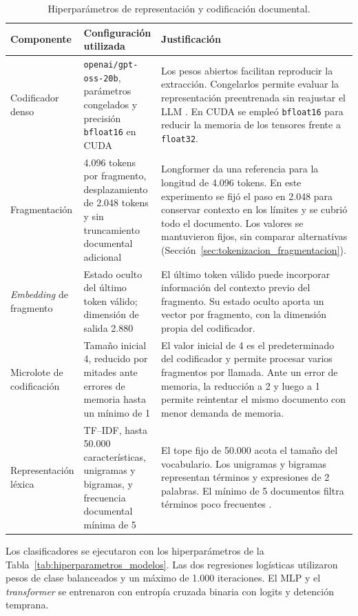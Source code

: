 \begin{table}[H]
\centering
\caption{Hiperparámetros de representación y codificación documental.}
\label{tab:hiperparametros_representacion}
\small
\begin{tabular}{p{2.6cm}p{4.4cm}p{5.4cm}}
\toprule
\textbf{Componente} & \textbf{Configuración utilizada} & \textbf{Justificación} \\
\midrule
Codificador denso & \texttt{openai/gpt-oss-20b}, parámetros congelados y precisión \texttt{bfloat16} en CUDA & Los pesos abiertos facilitan reproducir la extracción. Congelarlos permite evaluar la representación preentrenada sin reajustar el LLM \parencite{agarwal2025gptoss,wang2024improvingembeddings}. En CUDA se empleó \texttt{bfloat16} para reducir la memoria de los tensores frente a \texttt{float32}. \\
Fragmentación & 4.096 tokens por fragmento, desplazamiento de 2.048 tokens y sin truncamiento documental adicional & Longformer da una referencia para la longitud de 4.096 tokens. En este experimento se fijó el paso en 2.048 para conservar contexto en los límites y se cubrió todo el documento. Los valores se mantuvieron fijos, sin comparar alternativas (Sección~\ref{sec:tokenizacion_fragmentacion}). \\
\textit{Embedding} de fragmento & Estado oculto del último token válido; dimensión de salida 2.880 & El último token válido puede incorporar información del contexto previo del fragmento. Su estado oculto aporta un vector por fragmento, con la dimensión propia del codificador. \\
Microlote de codificación & Tamaño inicial 4, reducido por mitades ante errores de memoria hasta un mínimo de 1 & El valor inicial de 4 es el predeterminado del codificador y permite procesar varios fragmentos por llamada. Ante un error de memoria, la reducción a 2 y luego a 1 permite reintentar el mismo documento con menor demanda de memoria. \\
Representación léxica & TF--IDF, hasta 50.000 características, unigramas y bigramas, y frecuencia documental mínima de 5 & El tope fijo de 50.000 acota el tamaño del vocabulario. Los unigramas y bigramas representan términos y expresiones de 2 palabras. El mínimo de 5 documentos filtra términos poco frecuentes \parencite{wang2012baselines,alvaprincipe2025survey}. \\
\bottomrule
\end{tabular}
\end{table}

Los clasificadores se ejecutaron con los hiperparámetros de la Tabla~\ref{tab:hiperparametros_modelos}. Las dos regresiones logísticas utilizaron pesos de clase balanceados y un máximo de 1.000 iteraciones. El MLP y el \textit{transformer} se entrenaron con entropía cruzada binaria con logits y detención temprana.

